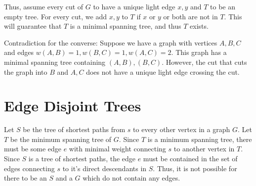 \documentclass[14pt, letterpaper]{article}
\begin{document}
Thus, assume every cut of $G$ to have a unique light edge $x, y$ and $T$ to be
an empty tree. For every cut, we add $x, y$ to $T$ if $x$ or $y$ or both are
not in $T$. This will guarantee that $T$ is a minimal spanning tree, and thus
$T$ exists.

Contradiction for the converse: Suppose we have a graph with vertices $A, B, C$ 
and edges $w(A, B) = 1, w(B, C) = 1, w(A, C) = 2$. This graph has a minimal 
spanning tree containing $(A, B), (B, C)$. However, the cut that cuts the graph
into $B$ and $A, C$ does not have a unique light edge crossing the cut.

\section{Edge Disjoint Trees}
Let $S$ be the tree of shortest paths from $s$ to every other vertex in a graph
$G$. Let $T$ be the minimum spanning tree of $G$. Since $T$ is a minimum
spanning tree, there must be some edge $e$ with minimal weight connecting $s$
to another vertex in $T$. Since $S$ is a tree of shortest paths, the edge $e$
must be contained in the set of edges connecting $s$ to it's direct descendants
in $S$. Thus, it is not possible for there to be an $S$ and a $G$ which do not
contain any edges.
\end{document}
